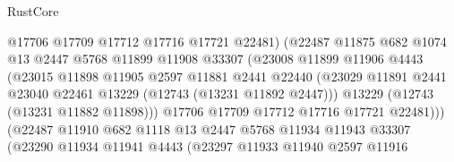 \begin{lexlean}{RustCore}
\begin{coremodule}
                                  @17706
                                  @17709
                                  @17712
                                  @17716
                                  @17721
                                  @22481)
                                (@22487
                                  @11875
                                  @682
                                  @1074
                                  @13
                                  @2447
                                  @5768
                                  @11899
                                  @11908
                                  @33307
                                  (@23008
                                    @11899
                                    @11906
                                    @4443
                                    (@23015
                                      @11898
                                      @11905
                                      @2597
                                      @11881
                                      @2441
                                      @22440
                                      (@23029
                                        @11891
                                        @2441
                                        @23040
                                        @22461
                                        @13229
                                        (@12743 (@13231 @11892 @2447)))
                                      @13229
                                      (@12743 (@13231 @11882 @11898)))
                                    @17706
                                    @17709
                                    @17712
                                    @17716
                                    @17721
                                    @22481)))
                              (@22487
                                @11910
                                @682
                                @1118
                                @13
                                @2447
                                @5768
                                @11934
                                @11943
                                @33307
                                (@23290
                                  @11934
                                  @11941
                                  @4443
                                  (@23297
                                    @11933
                                    @11940
                                    @2597
                                    @11916

\end{coremodule}
\end{lexlean}
